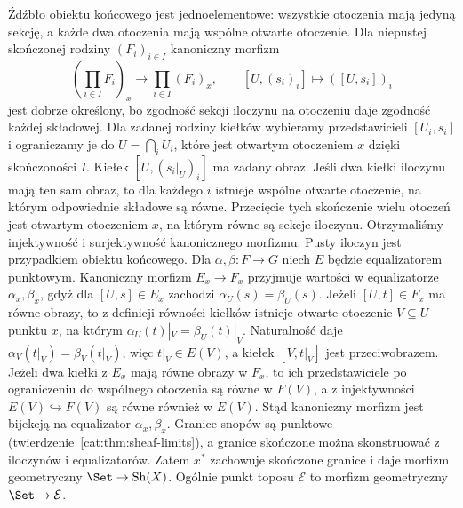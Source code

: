 \begin{przyklad}
Źdźbło obiektu końcowego jest jednoelementowe: wszystkie otoczenia mają jedyną sekcję, a każde dwa otoczenia mają wspólne otwarte otoczenie. Dla niepustej skończonej rodziny $(F_i)_{i\in I}$ kanoniczny morfizm
\[
 (\prod_{i\in I}F_i)_x\longrightarrow\prod_{i\in I}(F_i)_x,
 \qquad [U,(s_i)_i]\longmapsto([U,s_i])_i
\]
jest dobrze określony, bo zgodność sekcji iloczynu na otoczeniu daje zgodność każdej składowej. Dla zadanej rodziny kiełków wybieramy przedstawicieli $[U_i,s_i]$ i ograniczamy je do $U=\bigcap_i U_i$, które jest otwartym otoczeniem $x$ dzięki skończoności $I$. Kiełek $[U,(s_i|_U)_i]$ ma zadany obraz. Jeśli dwa kiełki iloczynu mają ten sam obraz, to dla każdego $i$ istnieje wspólne otwarte otoczenie, na którym odpowiednie składowe są równe. Przecięcie tych skończenie wielu otoczeń jest otwartym otoczeniem $x$, na którym równe są sekcje iloczynu. Otrzymaliśmy injektywność i surjektywność kanonicznego morfizmu. Pusty iloczyn jest przypadkiem obiektu końcowego. Dla $\alpha,\beta:F\to G$ niech $E$ będzie equalizatorem punktowym. Kanoniczny morfizm $E_x\to F_x$ przyjmuje wartości w equalizatorze $\alpha_x,\beta_x$, gdyż dla $[U,s]\in E_x$ zachodzi $\alpha_U(s)=\beta_U(s)$. Jeżeli $[U,t]\in F_x$ ma równe obrazy, to z definicji równości kiełków istnieje otwarte otoczenie $V\subseteq U$ punktu $x$, na którym $\alpha_U(t)|_V=\beta_U(t)|_V$. Naturalność daje $\alpha_V(t|_V)=\beta_V(t|_V)$, więc $t|_V\in E(V)$, a kiełek $[V,t|_V]$ jest przeciwobrazem. Jeżeli dwa kiełki z $E_x$ mają równe obrazy w $F_x$, to ich przedstawiciele po ograniczeniu do wspólnego otoczenia są równe w $F(V)$, a z injektywności $E(V)\hookrightarrow F(V)$ są równe również w $E(V)$. Stąd kanoniczny morfizm jest bijekcją na equalizator $\alpha_x,\beta_x$. Granice snopów są punktowe (twierdzenie~\ref{cat:thm:sheaf-limits}), a granice skończone można skonstruować z iloczynów i equalizatorów. Zatem $x^*$ zachowuje skończone granice i daje morfizm geometryczny $\Set\to\operatorname{Sh}(X)$. Ogólnie punkt toposu $\mathcal E$ to morfizm geometryczny $\Set\to\mathcal E$.
\end{przyklad}
